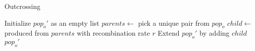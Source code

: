 \documentclass[12pt]{article}
\begin{document}
\begin{algorithm}
  \caption{Outcrossing}
  \label{algo:outcrossing}
  \begin{algorithmic}
    \State Initialize \(pop_{o}'\) as an empty list
    \State \(parents \gets\) pick a unique pair from \(pop_{o}\)
    \State \(child \gets\) produced from \(parents\) with
    recombination rate \(r\)
    \State Extend \(pop_{o}'\) by adding \(child\)
    \EndFor
    \State \Return \(pop_{o}'\)
    \EndFunction
  \end{algorithmic}
\end{algorithm}
\end{document}
